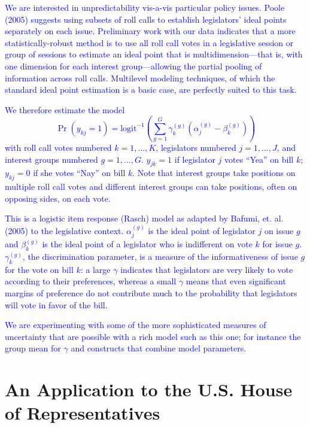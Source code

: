 \documentclass[12pt]{article}
\newcommand{\ga}{\gamma}
\begin{document}
\textcolor{blue}{We are interested in unpredictability vis-a-vis particular policy issues. Poole (2005) suggests using subsets of roll calls to establish legislators' ideal points separately on each issue. Preliminary work with our data indicates that a more statistically-robust method is to use all roll call votes in a legislative session or group of sessions to estimate an ideal point that is multidimension---that is, with one dimension for each interest group---allowing the partial pooling of information across roll calls. Multilevel modeling techniques, of which the standard ideal point estimation is a basic case, are perfectly suited to this task.}

\textcolor{blue}{We therefore estimate the model
\begin{equation}
  \Pr(y_{kj} = 1) = \text{logit}^{-1}\left( \sum_{g=1}^G \ga_k^{(g)}\left( \alpha_j^{(g)} - \beta_k^{(g)}\right) \right)
	\label{eq:v2}
\end{equation}
with roll call votes numbered $k=1,\ldots,K$, legislators numbered $j=1,\dots,J$, and interest groups numbered $g=1,\dots,G$. $y_{jk}=1$ if legislator $j$ votes ``Yea'' on bill $k$; $y_{kj}=0$ if she votes ``Nay'' on bill $k$. Note that interest groups take positions on multiple roll call votes and different interest groups can take positions, often on opposing sides, on each vote.}
		
\textcolor{blue}{This is a logistic item response (Rasch) model as adapted by Bafumi, et. al. (2005) to the legislative context. $\alpha_j^{(g)}$ is the ideal point of legislator $j$ on issue $g$ and $\beta_k^{(g)}$ is the ideal point of a legislator who is indifferent on vote $k$ for issue $g$. $\gamma_k^{(g)}$, the discrimination parameter, is a measure of the informativeness of issue $g$ for the vote on bill $k$: a large $\ga$ indicates that legislators are very likely to vote according to their preferences, whereas a small $\ga$ means that even significant margins of preference do not contribute much to the probability that legislators will vote in favor of the bill.}

\textcolor{blue}{We are experimenting with some of the more sophisticated measures of uncertainty that are possible with a rich model such as this one; for instance the group mean for $\ga$ and constructs that combine model parameters.}


\section{An Application to the U.S. House of Representatives}
\label{sec:house}
\end{document}
